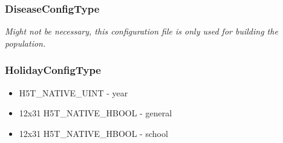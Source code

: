 \documentclass{article}
\begin{document}
			\subsubsection{DiseaseConfigType}
				\textit{Might not be necessary, this configuration file is only used for building the population.}

			\subsubsection{HolidayConfigType}
				\begin{itemize}
					\item H5T\_NATIVE\_UINT - year
					\item 12x31 H5T\_NATIVE\_HBOOL - general
					\item 12x31 H5T\_NATIVE\_HBOOL - school
				\end{itemize}
\end{document}
